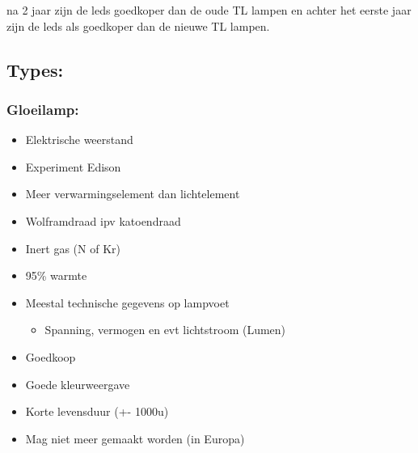 \documentclass[12pt]{article}
\begin{document}
na 2 jaar zijn de leds goedkoper dan de oude TL lampen en achter het eerste jaar zijn de leds als goedkoper dan de nieuwe TL lampen.
\subsection{Types:}
\subsubsection{Gloeilamp:}
\begin{itemize}
    \item Elektrische weerstand
    \item Experiment Edison 
    \item Meer verwarmingselement dan lichtelement
    \item Wolframdraad ipv katoendraad
    \item Inert gas (N of Kr)
    \item 95\% warmte
    \item Meestal technische gegevens op lampvoet\begin{itemize}
        \item Spanning, vermogen en evt lichtstroom (Lumen)
    \end{itemize}
    \item Goedkoop
    \item Goede kleurweergave
    \item Korte levensduur (+- 1000u)
    \item Mag niet meer gemaakt worden (in Europa)
\end{itemize}
\end{document}
